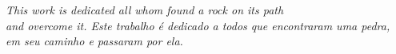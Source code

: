 


\begin{dedicatoria}

    \vspace*{\fill}
    \centering
    \noindent
    \textit{\lang
    {
        This work is dedicated all whom found a rock on its path\\
        and overcome it.
    }
    {
        Este trabalho é dedicado a todos que encontraram uma pedra,\\
        em seu caminho e passaram por ela.
    }}
    \vspace*{\fill}

\end{dedicatoria}


